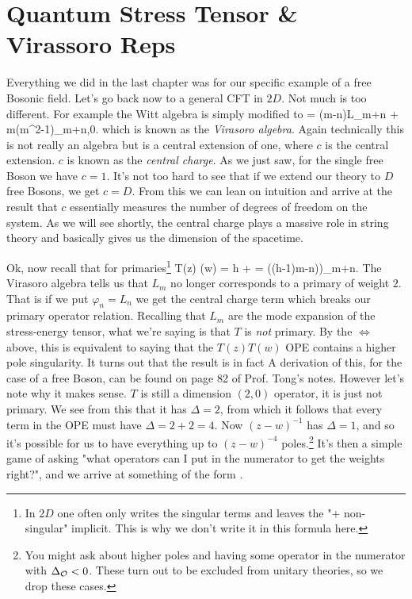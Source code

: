 \chapter{Quantum Stress Tensor \& Virassoro Reps}

Everything we did in the last chapter was for our specific example of a free Bosonic field. Let's go back now to a general CFT in $2D$. Not much is too different. For example the Witt algebra is simply modified to
\bse 
    [L_m,L_n] = (m-n)L_{m+n} +  m(m^2-1)\del_{m+n,0}.
\ese 
which is known as the \textit{Virasoro algebra}. Again technically this is not really an algebra but is a central extension of one, where $c$ is the central extension. $c$ is known as the \textit{central charge}. As we just saw, for the single free Boson we have $c=1$. It's not too hard to see that if we extend our theory to $D$ free Bosons, we get $c=D$. From this we can lean on intuition and arrive at the result that $c$ essentially measures the number of degrees of freedom on the system. As we will see shortly, the central charge plays a massive role in string theory and basically gives us the dimension of the spacetime. 

Ok, now recall that for primaries\footnote{In $2D$ one often only writes the singular terms and leaves the "$+$ non-singular" implicit. This is why we don't write it in this formula here.} 
\bse 
    T(z) \Phi(w) = h +  \qquad \iff \qquad [L_m,\varphi_n] = \big((h-1)m-n)\big)\varphi_{m+n}.
\ese 
The Virasoro algebra tells us that $L_m$ no longer corresponds to a primary of weight $2$. That is if we  put $\varphi_n=L_n$ we get the central charge term which breaks our primary operator relation. Recalling that $L_m$ are the mode expansion of the stress-energy tensor, what we're saying is that $T$ is \textit{not} primary. By the $\iff$ above, this is equivalent to saying that the $T(z)T(w)$ OPE contains a higher pole singularity. It turns out that the result is in fact 
A derivation of this, for the case of a free Boson, can be found on page 82 of Prof. Tong's notes. However let's note why it makes sense. $T$ is still a dimension $(2,0)$ operator, it is just not primary. We see from this that it has $\Delta=2$, from which it follows that every term in the OPE must have $\Delta=2+2=4$. Now $(z-w)^{-1}$ has $\Delta=1$, and so it's possible for us to have everything up to $(z-w)^{-4}$ poles.\footnote{You might ask about higher poles and having some operator in the numerator with $\Delta_{\mathcal{O}}<0$. These turn out to be excluded from unitary theories, so we drop these cases.} It's then a simple game of asking "what operators can I put in the numerator to get the weights right?", and we arrive at something of the form . 

